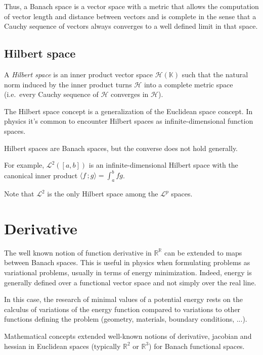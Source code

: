 Thus, a Banach space is a vector space with a metric that allows the computation of vector length and distance between vectors and is complete in the sense that a Cauchy sequence of vectors always converges to a well defined limit in that space.

\subsection{Hilbert space}

A \emph{Hilbert space} is an inner product vector space $\mathcal{H}(\mathbb{K})$ such that the natural norm induced by the inner product turns $\mathcal{H}$ into a complete metric space (i.e.\ every Cauchy sequence of $\mathcal{H}$ converges in $\mathcal{H}$).

The Hilbert space concept is a generalization of the Euclidean space concept.
In physics it's common to encounter Hilbert spaces as infinite-dimensional function spaces.

Hilbert spaces are Banach spaces, but the converse does not hold generally.

For example, $\mathcal{L}^2([a,b])$ is an infinite-dimensional Hilbert space with the canonical inner product $\langle f\,; g\rangle=\int_a^b fg$.

Note that $\mathcal{L}^2$ is the only Hilbert space among the $\mathcal{L}^p$ spaces.
\section{Derivative}

The well known notion of function derivative in $\mathbb{R}^\mathbb{R}$ can be extended to maps between Banach spaces.
This is useful in physics when formulating problems as variational problems, usually in terms of energy minimization. Indeed, energy is generally defined over a functional vector space and not simply over the real line.

In this case, the research of minimal values of a potential energy rests on the calculus of variations of the energy function compared to variations to other functions defining the problem (geometry, materials, boundary conditions, ...).

Mathematical concepts extended well-known notions of derivative, jacobian and hessian in Euclidean spaces (typically $\mathbb{R}^2$ or $\mathbb{R}^3$) for Banach functional spaces.

